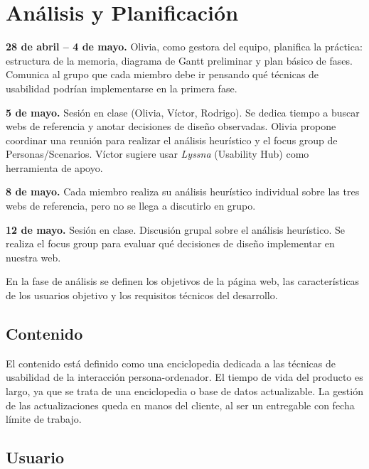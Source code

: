 \documentclass[12pt, a4paper]{report}
\begin{document}
\chapter{Análisis y Planificación}

\begin{notaejecucion}
\textbf{28 de abril – 4 de mayo.} Olivia, como gestora del equipo, planifica la práctica:
estructura de la memoria, diagrama de Gantt preliminar y plan básico de fases. Comunica al
grupo que cada miembro debe ir pensando qué técnicas de usabilidad podrían implementarse
en la primera fase.

\textbf{5 de mayo.} Sesión en clase (Olivia, Víctor, Rodrigo). Se dedica tiempo a buscar webs
de referencia y anotar decisiones de diseño observadas. Olivia propone coordinar una
reunión para realizar el análisis heurístico y el focus group de Personas/Scenarios. Víctor
sugiere usar \textit{Lyssna} (Usability Hub) como herramienta de apoyo.

\textbf{8 de mayo.} Cada miembro realiza su análisis heurístico individual sobre las tres webs
de referencia, pero no se llega a discutirlo en grupo.

\textbf{12 de mayo.} Sesión en clase. Discusión grupal sobre el análisis heurístico. Se
realiza el focus group para evaluar qué decisiones de diseño implementar en nuestra web.
\end{notaejecucion}

En la fase de análisis se definen los objetivos de la página web, las características de los
usuarios objetivo y los requisitos técnicos del desarrollo.

\section{Contenido}

El contenido está definido como una enciclopedia dedicada a las técnicas de usabilidad de
la interacción persona-ordenador. El tiempo de vida del producto es largo, ya que se trata de
una enciclopedia o base de datos actualizable. La gestión de las actualizaciones queda en
manos del cliente, al ser un entregable con fecha límite de trabajo.

\section{Usuario}
\end{document}
